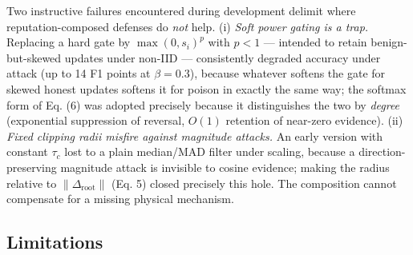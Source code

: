 \documentclass[cmc,article,submit,moreauthors,pdftex]{Definitions/tsp}
\begin{document}
Two instructive failures encountered during development delimit where reputation-composed defenses do \emph{not} help. (i) \emph{Soft power gating is a trap.} Replacing a hard gate by $\max(0, s_i)^p$ with $p < 1$ --- intended to retain benign-but-skewed updates under non-IID --- consistently degraded accuracy under attack (up to 14 F1 points at $\beta=0.3$), because whatever softens the gate for skewed honest updates softens it for poison in exactly the same way; the softmax form of Eq. (6) was adopted precisely because it distinguishes the two by \emph{degree} (exponential suppression of reversal, $O(1)$ retention of near-zero evidence). (ii) \emph{Fixed clipping radii misfire against magnitude attacks.} An early version with constant $\tau_c$ lost to a plain median/MAD filter under scaling, because a direction-preserving magnitude attack is invisible to cosine evidence; making the radius relative to $\|\Delta_{\mathrm{root}}\|$ (Eq. 5) closed precisely this hole. The composition cannot compensate for a missing physical mechanism.

\subsection{Limitations}\label{sec:limitations}
\end{document}
